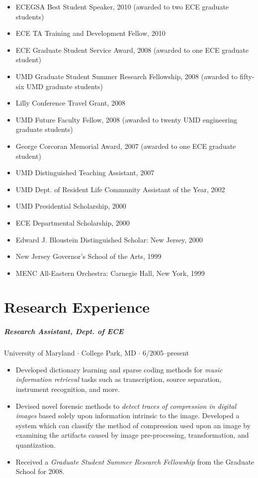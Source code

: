 \documentclass[10pt,letterpaper]{article}
\begin{document}
\begin{itemize}
\item ECEGSA Best Student Speaker, 2010 (awarded to two ECE graduate students)
\item ECE TA Training and Development Fellow, 2010
\item ECE Graduate Student Service Award, 2008 (awarded to one ECE graduate student)
\item UMD Graduate Student Summer Research Fellowship, 2008 (awarded to fifty-six UMD graduate students)
\item Lilly Conference Travel Grant, 2008
\item UMD Future Faculty Fellow, 2008 (awarded to twenty UMD engineering graduate students)
\item George Corcoran Memorial Award, 2007 (awarded to one ECE graduate student)
\item UMD Distinguished Teaching Assistant, 2007
\item UMD Dept. of Resident Life Community Assistant of the Year, 2002
\item UMD Presidential Scholarship, 2000
\item ECE Departmental Scholarship, 2000
\item Edward J. Bloustein Distinguished Scholar: New Jersey, 2000
\item New Jersey Governor's School of the Arts, 1999
\item MENC All-Eastern Orchestra: Carnegie Hall, New York, 1999
\end{itemize}


\section*{Research Experience}

\subparagraph{Research Assistant, Dept. of ECE}
University of Maryland $\cdot$ College Park, MD $\cdot$ 6/2005--present 
\begin{itemize}
\item Developed dictionary learning and sparse coding methods for \textit{music information retrieval} tasks such as transcription, source separation, instrument recognition, and more.
\item Devised novel forensic methods to \textit{detect traces of compression in digital images} based solely upon information intrinsic to the image. Developed a system which can classify the method of compression used upon an image by examining the artifacts caused by image pre-processing, transformation, and quantization.
\item Received a \textit{Graduate Student Summer Research Fellowship} from the Graduate School for 2008.
\end{itemize}
\end{document}
